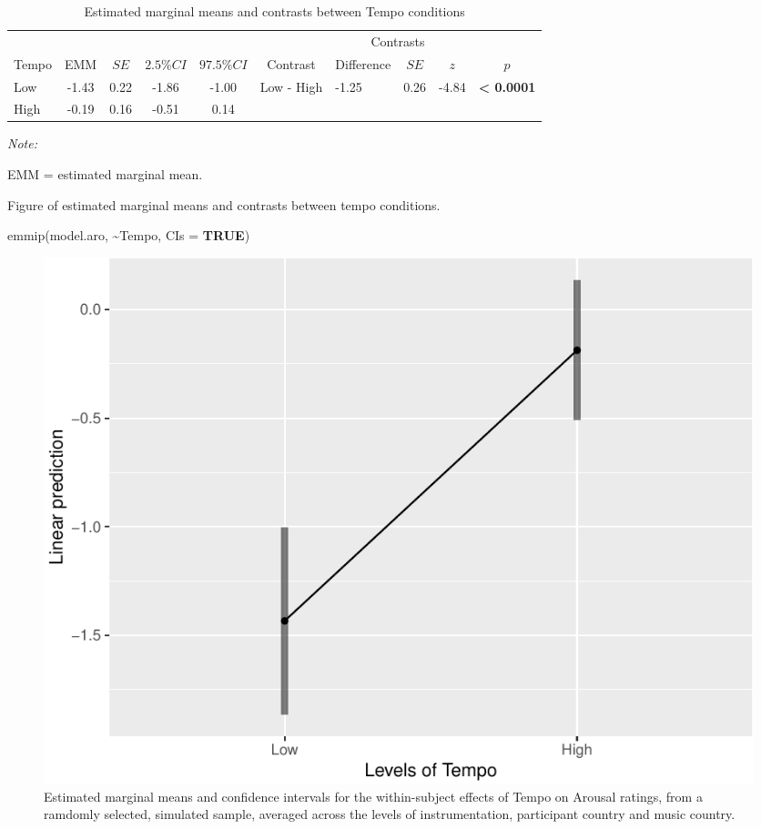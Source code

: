 \documentclass[
  bookmarksnumbered]{article}
\newenvironment{Shaded}{\begin{snugshade}}{\end{snugshade}}
\newcommand{\AttributeTok}[1]{\textcolor[rgb]{0.80,0.80,0.80}{#1}}
\newcommand{\ConstantTok}[1]{\textcolor[rgb]{0.86,0.64,0.64}{\textbf{#1}}}
\newcommand{\FunctionTok}[1]{\textcolor[rgb]{0.94,0.94,0.56}{#1}}
\newcommand{\NormalTok}[1]{\textcolor[rgb]{0.80,0.80,0.80}{#1}}
\newcommand{\SpecialCharTok}[1]{\textcolor[rgb]{0.86,0.64,0.64}{#1}}
\begin{document}
\begin{table}[H]

\caption{\label{tab:tab-aro-emms}Estimated marginal means and contrasts between Tempo conditions}
\centering
\begin{threeparttable}
\begin{tabular}[t]{lccccclccc}
\toprule
\multicolumn{5}{c}{ } & \multicolumn{5}{c}{Contrasts} \\
\cmidrule(l{3pt}r{3pt}){6-10}
Tempo & EMM & $SE$ & $2.5\% CI$ & $97.5\% CI$ & Contrast & Difference & $SE$ & $z$ & $p$\\
\midrule
Low & -1.43 & 0.22 & -1.86 & -1.00 & Low - High & -1.25 & 0.26 & -4.84 & \textbf{< 0.0001}\\
High & -0.19 & 0.16 & -0.51 & 0.14 &  &  &  &  & \\
\bottomrule
\end{tabular}
\begin{tablenotes}[para]
\item \textit{Note: } 
\item EMM = estimated marginal mean.
\end{tablenotes}
\end{threeparttable}
\end{table}

Figure of estimated marginal means and contrasts between tempo conditions.

\begin{Shaded}
\begin{Highlighting}[]
\FunctionTok{emmip}\NormalTok{(model.aro, }\SpecialCharTok{\textasciitilde{}}\NormalTok{Tempo, }\AttributeTok{CIs =} \ConstantTok{TRUE}\NormalTok{)}
\end{Highlighting}
\end{Shaded}

\begin{figure}
\centering
\includegraphics{Power_analysis_files/figure-latex/unnamed-chunk-19-1.pdf}
\caption{\label{fig:unnamed-chunk-19}Estimated marginal means and confidence intervals for the within-subject effects of Tempo on Arousal ratings, from a ramdomly selected, simulated sample, averaged across the levels of instrumentation, participant country and music country.}
\end{figure}
\end{document}
